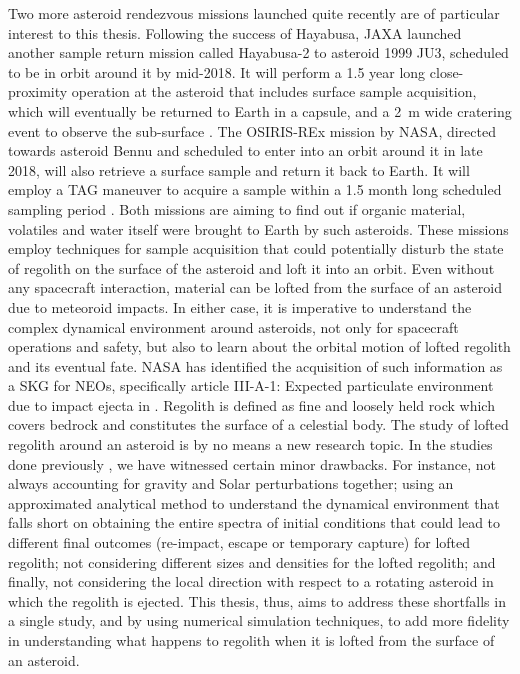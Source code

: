 Two more asteroid rendezvous missions launched quite recently are of particular interest to this thesis. Following the success of Hayabusa, \gls{JAXA} launched another sample return mission called Hayabusa-2 to asteroid 1999 JU3, scheduled to be in orbit around it by mid-2018. It will perform a 1.5 year long close-proximity operation at the asteroid that includes surface sample acquisition, which will eventually be returned to Earth in a capsule, and a \SI{2}{\metre} wide cratering event to observe the sub-surface \parencite{TsudaHayabusa2SystemDesign}. The \gls{OSIRIS-REx} mission by \gls{NASA}, directed towards asteroid Bennu and scheduled to enter into an orbit around it in late 2018, will also retrieve a surface sample and return it back to Earth. It will employ a \gls{TAG} maneuver to acquire a sample within a 1.5 month long scheduled sampling period \parencite{berry2013osiris}. Both missions are aiming to find out if organic material, volatiles and water itself were brought to Earth by such asteroids. These missions employ techniques for sample acquisition that could potentially disturb the state of regolith on the surface of the asteroid and loft it into an orbit. Even without any spacecraft interaction, material can be lofted from the surface of an asteroid due to meteoroid impacts. In either case, it is imperative to understand the complex dynamical environment around asteroids, not only for spacecraft operations and safety, but also to learn about the orbital motion of lofted regolith and its eventual fate. \gls{NASA} has identified the acquisition of such information as a \gls{SKG} for \glspl{NEO}, specifically article III-A-1: Expected particulate environment due to impact ejecta in \cite{nasa_skg}.
%
\newline\newline
%
Regolith is defined as fine and loosely held rock which covers bedrock and constitutes the surface of a celestial body. The study of lofted regolith around an asteroid is by no means a new research topic. In the studies done previously \parencite{richter1995stability,lee1996dust,scheeres1996orbits,scheeres2000ejecta,korycansky2004_impactEjecta,yarnoz2014passive}, we have witnessed certain minor drawbacks. For instance, not always accounting for gravity and Solar perturbations together; using an approximated analytical method to understand the dynamical environment that falls short on obtaining the entire spectra of initial conditions that could lead to different final outcomes (re-impact, escape or temporary capture) for lofted regolith; not considering different sizes and densities for the lofted regolith; and finally, not considering the local direction with respect to a rotating asteroid in which the regolith is ejected. This thesis, thus, aims to address these shortfalls in a single study, and by using numerical simulation techniques, to add more fidelity in understanding what happens to regolith when it is lofted from the surface of an asteroid.

